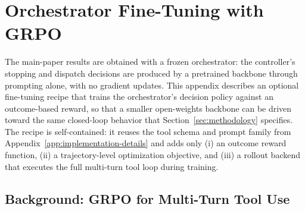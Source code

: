 %     

\section{Orchestrator Fine-Tuning with GRPO}
\label{app:training}

The main-paper results are obtained with a frozen orchestrator: the controller's stopping and dispatch decisions are produced by a pretrained backbone through prompting alone, with no gradient updates. This appendix describes an optional fine-tuning recipe that trains the orchestrator's decision policy against an outcome-based reward, so that a smaller open-weights backbone can be driven toward the same closed-loop behavior that Section~\ref{sec:methodology} specifies. The recipe is self-contained: it reuses the \our{} tool schema and prompt family from Appendix~\ref{app:implementation-details} and adds only (i) an outcome reward function, (ii) a trajectory-level optimization objective, and (iii) a rollout backend that executes the full multi-turn tool loop during training.

\subsection{Background: GRPO for Multi-Turn Tool Use}
\label{app:training-grpo-background}

